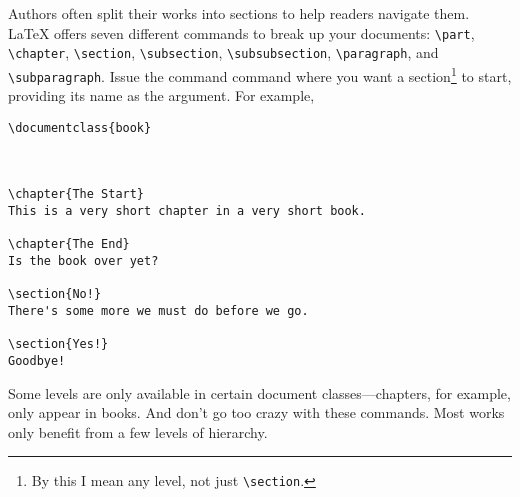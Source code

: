 Authors often split their works into sections to help readers navigate them.
\LaTeX{} offers seven different commands to break up your documents:
\verb|\part|, \verb|\chapter|, \verb|\section|, \verb|\subsection|,
\verb|\subsubsection|, \verb|\paragraph|, and \verb|\subparagraph|.
Issue the command command where you want a section\footnote{By this
I mean any level, not just \texttt{\textbackslash section}.} to start,
providing its name as the argument.
For example,
\begin{leftfigure}
\begin{lstlisting}
\documentclass{book}



\chapter{The Start}
This is a very short chapter in a very short book.

\chapter{The End}
Is the book over yet?

\section{No!}
There's some more we must do before we go.

\section{Yes!}
Goodbye!

\end{lstlisting}
\end{leftfigure}
Some levels are only available in certain document classes---chapters,
for example, only appear in books.
And don't go too crazy with these commands.
Most works only benefit from a few levels of hierarchy.

